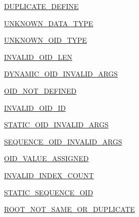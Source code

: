 \begin{DoxyCompactItemize}
\item 
\hyperlink{enummib2bib_1_1mib2bib_1_1_f_i_l_e___e_r_r_o_r___c_o_d_e_ae4d88f70258bafbe87a90957cc172fd1}{D\+U\+P\+L\+I\+C\+A\+T\+E\+\_\+\+D\+E\+F\+I\+N\+E}
\item 
\hyperlink{enummib2bib_1_1mib2bib_1_1_f_i_l_e___e_r_r_o_r___c_o_d_e_a894e13bfd059fc1e8cf8e632d6670387}{U\+N\+K\+N\+O\+W\+N\+\_\+\+D\+A\+T\+A\+\_\+\+T\+Y\+P\+E}
\item 
\hyperlink{enummib2bib_1_1mib2bib_1_1_f_i_l_e___e_r_r_o_r___c_o_d_e_a15c30156a587c20cec73a82c1934eb36}{U\+N\+K\+N\+O\+W\+N\+\_\+\+O\+I\+D\+\_\+\+T\+Y\+P\+E}
\item 
\hyperlink{enummib2bib_1_1mib2bib_1_1_f_i_l_e___e_r_r_o_r___c_o_d_e_a87d917c0d05d71d219ae2fe0cf418eed}{I\+N\+V\+A\+L\+I\+D\+\_\+\+O\+I\+D\+\_\+\+L\+E\+N}
\item 
\hyperlink{enummib2bib_1_1mib2bib_1_1_f_i_l_e___e_r_r_o_r___c_o_d_e_a7623266a142ac9201a95d3c8bbb585f4}{D\+Y\+N\+A\+M\+I\+C\+\_\+\+O\+I\+D\+\_\+\+I\+N\+V\+A\+L\+I\+D\+\_\+\+A\+R\+G\+S}
\item 
\hyperlink{enummib2bib_1_1mib2bib_1_1_f_i_l_e___e_r_r_o_r___c_o_d_e_a938512a5182e0a270f3b3417b2fa951d}{O\+I\+D\+\_\+\+N\+O\+T\+\_\+\+D\+E\+F\+I\+N\+E\+D}
\item 
\hyperlink{enummib2bib_1_1mib2bib_1_1_f_i_l_e___e_r_r_o_r___c_o_d_e_a43919b3ec60a94db2f6960638c7325e5}{I\+N\+V\+A\+L\+I\+D\+\_\+\+O\+I\+D\+\_\+\+I\+D}
\item 
\hyperlink{enummib2bib_1_1mib2bib_1_1_f_i_l_e___e_r_r_o_r___c_o_d_e_aead42da6828fca7af9ea21e844fdb0a2}{S\+T\+A\+T\+I\+C\+\_\+\+O\+I\+D\+\_\+\+I\+N\+V\+A\+L\+I\+D\+\_\+\+A\+R\+G\+S}
\item 
\hyperlink{enummib2bib_1_1mib2bib_1_1_f_i_l_e___e_r_r_o_r___c_o_d_e_a891c28e3c9a787f44b5beda6870a1866}{S\+E\+Q\+U\+E\+N\+C\+E\+\_\+\+O\+I\+D\+\_\+\+I\+N\+V\+A\+L\+I\+D\+\_\+\+A\+R\+G\+S}
\item 
\hyperlink{enummib2bib_1_1mib2bib_1_1_f_i_l_e___e_r_r_o_r___c_o_d_e_a3c93de6683d01e17827db1d0eb7dbac8}{O\+I\+D\+\_\+\+V\+A\+L\+U\+E\+\_\+\+A\+S\+S\+I\+G\+N\+E\+D}
\item 
\hyperlink{enummib2bib_1_1mib2bib_1_1_f_i_l_e___e_r_r_o_r___c_o_d_e_a6f868b0c15e8e1e46c8a8eec9743bcdc}{I\+N\+V\+A\+L\+I\+D\+\_\+\+I\+N\+D\+E\+X\+\_\+\+C\+O\+U\+N\+T}
\item 
\hyperlink{enummib2bib_1_1mib2bib_1_1_f_i_l_e___e_r_r_o_r___c_o_d_e_a14b005a117244a8b81f63be49e20f35f}{S\+T\+A\+T\+I\+C\+\_\+\+S\+E\+Q\+U\+E\+N\+C\+E\+\_\+\+O\+I\+D}
\item 
\hyperlink{enummib2bib_1_1mib2bib_1_1_f_i_l_e___e_r_r_o_r___c_o_d_e_ac4406961afe06f52e258356e53b6aebc}{R\+O\+O\+T\+\_\+\+N\+O\+T\+\_\+\+S\+A\+M\+E\+\_\+\+O\+R\+\_\+\+D\+U\+P\+L\+I\+C\+A\+T\+E}

\end{DoxyCompactItemize}
